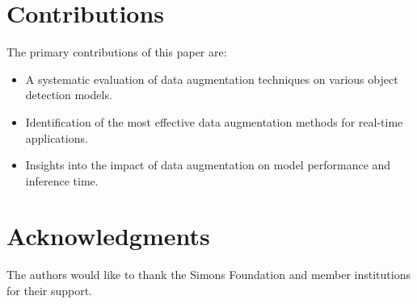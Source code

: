 \documentclass{article}
\begin{document}
\section{Contributions}
The primary contributions of this paper are:
\begin{itemize}
    \item A systematic evaluation of data augmentation techniques on various object detection models.
    \item Identification of the most effective data augmentation methods for real-time applications.
    \item Insights into the impact of data augmentation on model performance and inference time.
\end{itemize}

\section*{Acknowledgments}
The authors would like to thank the Simons Foundation and member institutions for their support.



\end{document}
